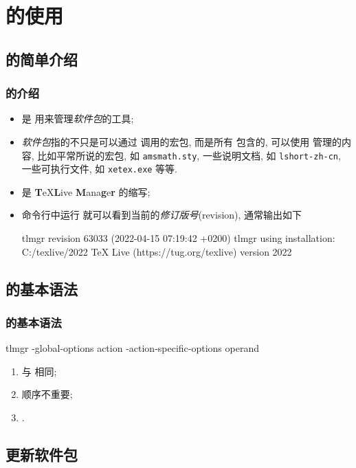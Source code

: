\section{\texorpdfstring{\tlmgr}{tlmgr} 的使用}
\subsection{\texorpdfstring{\tlmgr}{tlmgr} 的简单介绍}
\begin{frame}[fragile]
  \frametitle{\tlmgr 的介绍}
  \begin{itemize}
    \item \tlmgr 是 \texlive 用来管理\emph{软件包}的工具;
    \item \emph{软件包}指的不只是可以通过 \lcmd{\usepackage} 调用的宏包, 而是所有 \texlive 包含的, 可以使用 \tlmgr 管理的内容, 比如平常所说的宏包, 如 \lstinline{amsmath.sty}, 一些说明文档, 如 \lstinline{lshort-zh-cn}, 一些可执行文件, 如 \lstinline{xetex.exe} 等等.
    \item \tlmgr 是 \textbf{T}eX\textbf{L}ive \textbf{M}ana\textbf{g}e\textbf{r} 的缩写;
    \item 命令行中运行  就可以看到当前的\emph{修订版号}(revision), 通常输出如下
\begin{outputcode}
tlmgr revision 63033 (2022-04-15 07:19:42 +0200)
tlmgr using installation: C:/texlive/2022
TeX Live (https://tug.org/texlive) version 2022
\end{outputcode}
  \end{itemize}
\end{frame}

\subsection{\texorpdfstring{\tlmgr}{tlmgr} 的基本语法}

\begin{frame}[fragile]
  \frametitle{\tlmgr 的基本语法}
\begin{cmdcode}
tlmgr -global-options action -action-specific-options operand
\end{cmdcode}
\begin{enumerate}
  \item \cmd{-} 与 \cmd{--} 相同;
  \item 顺序不重要;
  \item {}.
\end{enumerate}
\end{frame}

\subsection{更新软件包}

